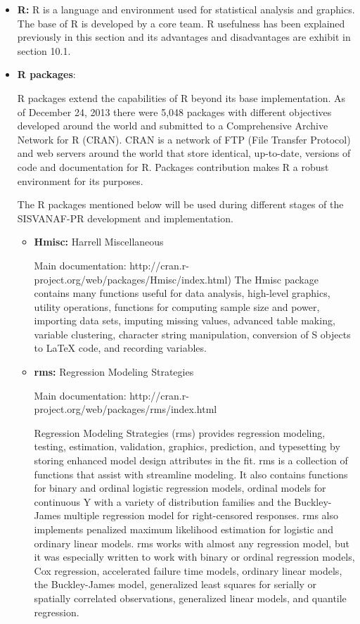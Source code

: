 \documentclass[12pt,letterpaper]{report}
\begin{document}
\begin{itemize}

\item \textbf{R:} R is a language and environment used for statistical analysis and graphics. The base of R is developed by a core team. \cite{Rlanguage} R usefulness has been explained previously in this section and its advantages and disadvantages are exhibit in section 10.1.

\item \textbf{R packages}:

R packages extend the capabilities of R beyond its base implementation. As of December 24, 2013 there were 5,048 packages with different objectives developed around the world and submitted to a Comprehensive Archive Network for R (CRAN). CRAN is a network of FTP (File Transfer Protocol) and web servers around the world that store identical, up-to-date, versions of code and documentation for R.  Packages contribution makes R a robust environment for its purposes. \cite{Rlanguage}

The R packages mentioned below will be used during different stages of the SISVANAF-PR development and implementation.

\begin{itemize}

\item \textbf{Hmisc:} Harrell Miscellaneous \cite{Harrell2013Hmisc}
	
Main documentation: http://cran.r-project.org/web/packages/Hmisc/index.html)
The Hmisc package contains many functions useful for data analysis, high-level graphics, utility operations, functions for computing sample size and power, importing data sets, imputing missing values, advanced table making, variable clustering, character string manipulation, conversion of S objects to LaTeX code, and recording variables.

\item \textbf{rms:} Regression Modeling Strategies \cite{Harrell2013rms}

Main documentation: http://cran.r-project.org/web/packages/rms/index.html

Regression Modeling Strategies (rms) provides regression modeling, testing, estimation, validation, graphics, prediction, and typesetting by storing enhanced model design attributes in the fit. rms is a collection of functions that assist with streamline modeling. It also contains functions for binary and ordinal logistic regression models, ordinal models for continuous Y with a variety of distribution families and the Buckley-James multiple regression model for right-censored responses. rms also implements penalized maximum likelihood estimation for logistic and ordinary linear models. rms works with almost any regression model, but it was especially written to work with binary or ordinal regression models, Cox regression, accelerated failure time models, ordinary linear models, the Buckley-James model, generalized least squares for serially or spatially correlated observations, generalized linear models, and quantile regression. 


\end{itemize}
\end{itemize}
\end{document}

